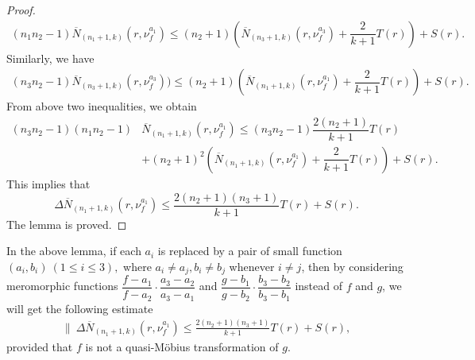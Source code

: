 \documentclass[12pt,leqno]{amsart}
\numberwithin{equation}{section}
\begin{document}
\begin{proof}
\begin{align*}
(n_1n_2-1)\overline N_{(n_1+1,k)}(r,\nu^{a_1}_f)\le (n_2+1)\left(\overline N_{(n_3+1,k)}(r,\nu^{a_3}_{f})+\dfrac{2}{k+1}T(r)\right)+S(r).
\end{align*}
Similarly, we have
\begin{align*}
(n_3n_2-1)\overline N_{(n_3+1,k)}(r,\nu^{a_3}_f))\le (n_2+1)\left(\overline N_{(n_1+1,k)}(r,\nu^{a_1}_{f})+\dfrac{2}{k+1}T(r)\right)+S(r).
\end{align*}
From above two inequalities, we obtain
\begin{align*}
(n_3n_2-1)(n_1n_2-1)&\overline N_{(n_1+1,k)}(r,\nu^{a_1}_f)\le (n_3n_2-1)\dfrac{2(n_2+1)}{k+1}T(r)\\ 
&+(n_2+1)^2\left(\overline N_{(n_1+1,k)}(r,\nu^{a_1}_{f})+\dfrac{2}{k+1}T(r)\right)+S(r).
\end{align*}
This implies that
$$\Delta\overline N_{(n_1+1,k)}(r,\nu^{a_1}_f)\le \frac{2(n_2+1)(n_3+1)}{k+1}T(r)+S(r).$$
The lemma is proved.
\end{proof}
In the above lemma, if each $a_i$ is replaced by a pair of small function $(a_i,b_i)\ (1\le i\le 3),$ where $a_i\ne a_j,b_i\ne b_j$ whenever $i\ne j$, then by considering meromorphic functions $\dfrac{f-a_1}{f-a_2}\cdot \dfrac{a_3-a_2}{a_3-a_1}$ and $\dfrac{g-b_1}{g-b_2}\cdot \dfrac{b_3-b_2}{b_3-b_1}$ instead of $f$ and $g$, we will get the following estimate
\begin{align}\label{3.5}
\|\ \Delta\overline N_{(n_1+1,k)}(r,\nu^{a_1}_f)\le \frac{2(n_2+1)(n_3+1)}{k+1}T(r)+S(r),
\end{align}
provided that $f$ is not a quasi-M\"{o}bius transformation of $g$.
\end{document}
